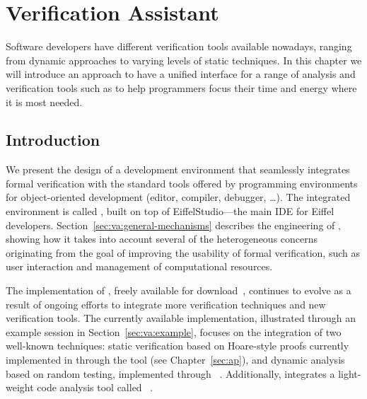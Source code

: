 \chapter{Verification Assistant}
\label{sec:va}


Software developers have different verification tools available nowadays, ranging from dynamic approaches to varying levels of static techniques.
In this chapter we will introduce an approach to have a unified interface for a range of analysis and verification tools such as \AutoProof to help programmers focus their time and energy where it is most needed.


\section{Introduction}
\label{sec:va-intro}

We present the design of a development environment that seamlessly integrates formal verification with the standard tools offered by programming environments for object-oriented development (editor, compiler, debugger, \ldots). 
The integrated environment is called \EVE, built on top of EiffelStudio---the main IDE for Eiffel developers.
Section~\ref{sec:va:general-mechanisms} describes the engineering of \EVE, showing how it takes into account several of the heterogeneous concerns originating from the goal of improving the usability of formal verification, such as user interaction and management of computational resources.

The implementation of \EVE, freely available for download~\cite{EVE}, continues to evolve as a result of ongoing efforts to integrate more verification techniques and new verification tools.
The currently available implementation, illustrated through an example session in Section~\ref{sec:va:example}, focuses on the integration of two well-known techniques: static verification based on Hoare-style proofs currently implemented in \EVE through the \AutoProof tool (see Chapter~\ref{sec:ap}), and dynamic analysis based on random testing, implemented through \AutoTest~\cite{MEYER09}.
Additionally, \EVE integrates a light-weight code analysis tool called \Inspector~\cite{ZURFLUH14}.



